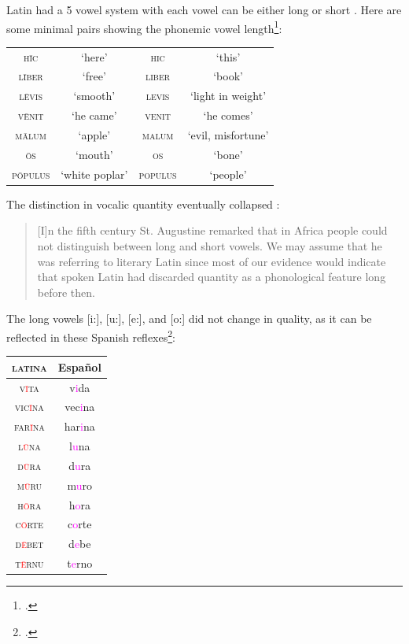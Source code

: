 \documentclass{report}[12pt]
\begin{document}
Latin had a 5 vowel system with each vowel can be either long or short \parencites[p.~6]{romance_his}[p.~44]{penny_spanish}[p.~70]{lloyd_spanish}. Here are some minimal pairs showing the phonemic vowel length\footcite[p.~45]{penny_spanish}:
\begin{center}
  \begin{tabular}{c c c c}
    \textsc{h\={i}c} & `here' & \textsc{hic} & `this' \\
    \textsc{l\={i}ber} & `free' & \textsc{liber} & `book' \\
    \textsc{l\={e}vis} & `smooth' & \textsc{levis} & `light in weight' \\
    \textsc{v\={e}nit} & `he came' & \textsc{venit} & `he comes' \\
    \textsc{m\={a}lum} & `apple' & \textsc{malum} & `evil, misfortune' \\
    \textsc{\={o}s} & `mouth' & \textsc{os} & `bone' \\
    \textsc{p\={o}pulus} & `white poplar' & \textsc{populus} & `people' \\
  \end{tabular}
\end{center}
The distinction in vocalic quantity eventually collapsed \parencite[p.~112]{lloyd_spanish}:
\begin{quote}
  [I]n the fifth century St. Augustine remarked that in Africa people could not distinguish between long and short vowels. We may assume that he was referring to literary Latin since most of our evidence would indicate that spoken Latin had discarded quantity as a phonological feature long before then.
\end{quote}
The long vowels [i:], [u:], [e:], and [o:] did not change in quality, as it can be reflected in these Spanish reflexes\footcite[p.~12]{romance_his}:
\begin{center}
\begin{tabular}{c c}
  \textsc{latina} & Español \\
  \hline
  \textsc{v\textcolor{red}{\={i}}ta} & v\textcolor{magenta}{i}da \\
  \textsc{vic\textcolor{red}{\={i}}na} & vec\textcolor{magenta}{i}na \\
  \textsc{far\textcolor{red}{\={i}}na} & har\textcolor{magenta}{i}na \\
  \textsc{l\textcolor{red}{\={u}}na} & l\textcolor{magenta}{u}na \\
  \textsc{d\textcolor{red}{\={u}}ra} & d\textcolor{magenta}{u}ra \\
  \textsc{m\textcolor{red}{\={u}}ru} & m\textcolor{magenta}{u}ro \\
  \textsc{h\textcolor{red}{\={o}}ra} & h\textcolor{magenta}{o}ra \\
  \textsc{c\textcolor{red}{\={o}}rte} & c\textcolor{magenta}{o}rte \\
  \textsc{d\textcolor{red}{\={e}}bet} & d\textcolor{magenta}{e}be \\
  \textsc{t\textcolor{red}{\={e}}rnu} & t\textcolor{magenta}{e}rno \\
\end{tabular}
\end{center}
\end{document}
